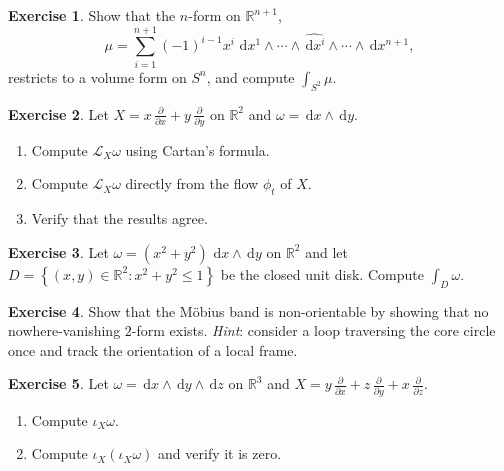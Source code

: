 \documentclass[12pt,a4paper,openany]{book}
\theoremstyle{definition}
\newtheorem{exercise}{Exercise}[chapter]
\theoremstyle{remark}
\newcommand{\R}{\mathbb{R}}
\newcommand{\dd}{\,\mathrm{d}}
\newcommand{\set}[1]{\left\{ #1 \right\}}
\begin{document}
\begin{exercise}\label{exo:volume-form-Sn}
Show that the $n$-form on $\R^{n+1}$,
\[
  \mu = \sum_{i=1}^{n+1} (-1)^{i-1} x^i\, \dd x^1 \wedge \cdots
    \wedge \widehat{\dd x^i} \wedge \cdots \wedge \dd x^{n+1},
\]
restricts to a volume form on $S^n$, and compute $\int_{S^2} \mu$.
\end{exercise}

\begin{exercise}\label{exo:lie-derivative-computation}
Let $X = x\,\frac{\partial}{\partial x} + y\,\frac{\partial}{\partial y}$
on $\R^2$ and $\omega = \dd x \wedge \dd y$.
\begin{enumerate}[label=(\alph*)]
  \item Compute $\mathcal{L}_X \omega$ using Cartan's formula.
  \item Compute $\mathcal{L}_X \omega$ directly from the flow $\phi_t$ of $X$.
  \item Verify that the results agree.
\end{enumerate}
\end{exercise}

\begin{exercise}\label{exo:integration-form}
Let $\omega = (x^2 + y^2)\,\dd x \wedge \dd y$ on $\R^2$ and let
$D = \set{(x,y) \in \R^2 : x^2 + y^2 \leq 1}$ be the closed unit disk.
Compute $\int_D \omega$.
\end{exercise}

\begin{exercise}\label{exo:orientation-nform}
Show that the M\"obius band is non-orientable by showing that no
nowhere-vanishing $2$-form exists. \textit{Hint}: consider a loop
traversing the core circle once and track the orientation of a local
frame.
\end{exercise}

\begin{exercise}\label{exo:interior-product-computation}
Let $\omega = \dd x \wedge \dd y \wedge \dd z$ on $\R^3$ and
$X = y\,\frac{\partial}{\partial x} + z\,\frac{\partial}{\partial y}
+ x\,\frac{\partial}{\partial z}$.
\begin{enumerate}[label=(\alph*)]
  \item Compute $\iota_X \omega$.
  \item Compute $\iota_X(\iota_X \omega)$ and verify it is zero.
\end{enumerate}
\end{exercise}
\end{document}
